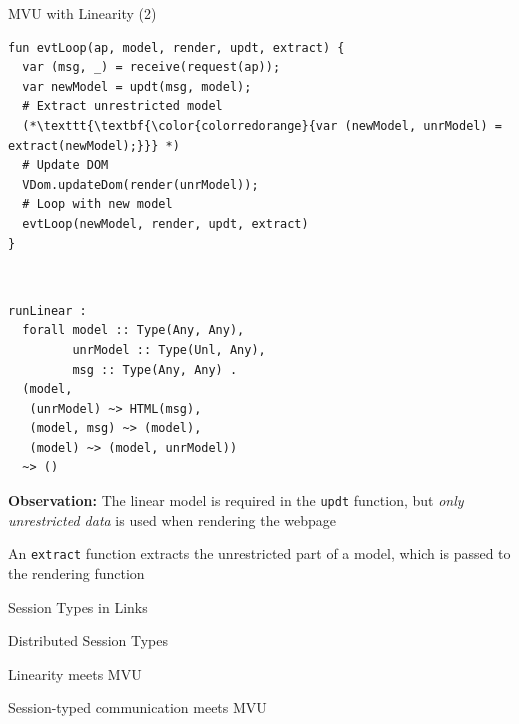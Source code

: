 \documentclass[11.5pt, aspectratio=169]{beamer}
\begin{document}
\begin{frame}[fragile]{MVU with Linearity (2)}

\begin{minipage}{0.55\textwidth}
  \begin{lstlisting}[language=links]
fun evtLoop(ap, model, render, updt, extract) {
  var (msg, _) = receive(request(ap));
  var newModel = updt(msg, model);
  # Extract unrestricted model
  (*\texttt{\textbf{\color{colorredorange}{var (newModel, unrModel) = extract(newModel);}}} *)
  # Update DOM
  VDom.updateDom(render(unrModel));
  # Loop with new model
  evtLoop(newModel, render, updt, extract)
}
  \end{lstlisting}
\end{minipage}
~
\begin{minipage}{0.42\textwidth}
\begin{verbatim}
runLinear :
  forall model :: Type(Any, Any),
         unrModel :: Type(Unl, Any),
         msg :: Type(Any, Any) .
  (model,
   (unrModel) ~> HTML(msg),
   (model, msg) ~> (model),
   (model) ~> (model, unrModel))
  ~> ()
\end{verbatim}
\end{minipage}

  \begin{fullpageitemize}
  \item \textbf{Observation:} The linear model is required in the \texttt{updt} function, but \emph{only unrestricted data} is used when rendering the webpage
    \begin{itemize}
      \itemR An \texttt{extract} function extracts the unrestricted part of a model, which is passed to the rendering function
    \end{itemize}
  \end{fullpageitemize}
\end{frame}



\begin{frame}{Session Types in Links}
\end{frame}

\begin{frame}{Distributed Session Types}
\end{frame}

\begin{frame}{Linearity meets MVU}
\end{frame}

\begin{frame}{Session-typed communication meets MVU}
\end{frame}
\end{document}
